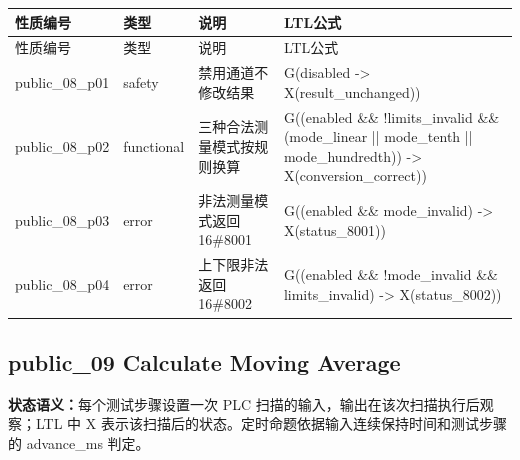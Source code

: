 \begin{longtable}{L{2.3cm}L{1.7cm}L{4.1cm}L{5.2cm}}

\toprule

性质编号 & 类型 & 说明 & LTL公式\\

\midrule

\endfirsthead

\toprule

性质编号 & 类型 & 说明 & LTL公式\\

\midrule

\endhead

{\ttfamily public\_08\_p01} & safety & 禁用通道不修改结果 & {\ttfamily G(disabled -> X(result\_unchanged))}\\

{\ttfamily public\_08\_p02} & functional & 三种合法测量模式按规则换算 & {\ttfamily G((enabled \&\& !limits\_invalid \&\& (mode\_linear || mode\_tenth || mode\_hundredth)) -> X(conversion\_correct))}\\

{\ttfamily public\_08\_p03} & error & 非法测量模式返回 16\#8001 & {\ttfamily G((enabled \&\& mode\_invalid) -> X(status\_8001))}\\

{\ttfamily public\_08\_p04} & error & 上下限非法返回 16\#8002 & {\ttfamily G((enabled \&\& !mode\_invalid \&\& limits\_invalid) -> X(status\_8002))}\\

\bottomrule

\end{longtable}

\subsection{{\ttfamily public\_09} Calculate Moving Average}

\noindent\textbf{状态语义：}每个测试步骤设置一次 PLC 扫描的输入，输出在该次扫描执行后观察；LTL 中 X 表示该扫描后的状态。定时命题依据输入连续保持时间和测试步骤的 advance\_ms 判定。

